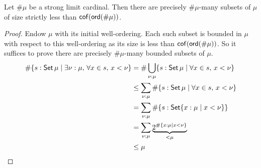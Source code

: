 \begin{lemma}[mathlib]
  \label{prop:card_subset_card_lt_cof}
  Let \( \#\mu \) be a strong limit cardinal.
  Then there are precisely \( \#\mu \)-many subsets of \( \mu \) of size strictly less than \( \operatorname{\mathsf{cof}}(\operatorname{\mathsf{ord}}(\#\mu)) \).
\end{lemma}
\begin{proof}
  Endow \( \mu \) with its initial well-ordering.
  Each such subset is bounded in \( \mu \) with respect to this well-ordering as its size is less than \( \operatorname{\mathsf{cof}}(\operatorname{\mathsf{ord}}(\#\mu)) \).
  So it suffices to prove there are precisely \( \#\mu \)-many bounded subsets of \( \mu \).
  \begin{align*}
    \#\{ s : \operatorname{\mathsf{Set}} \mu \mid \exists \nu : \mu,\, \forall x \in s,\, x < \nu \}
    &= \#\bigcup_{\nu : \mu} \{ s : \operatorname{\mathsf{Set}} \mu \mid \forall x \in s,\, x < \nu \} \\
    &\leq \sum_{\nu : \mu} \#\{ s : \operatorname{\mathsf{Set}} \mu \mid \forall x \in s,\, x < \nu \} \\
    &= \sum_{\nu : \mu} \#\{ s : \operatorname{\mathsf{Set}} \{ x : \mu \mid x < \nu \}\} \\
    &= \sum_{\nu : \mu} \underbrace{2^{\#\{ x : \mu \mid x < \nu \}}}_{<\mu} \\
    &\leq \mu
  \end{align*}
\end{proof}
